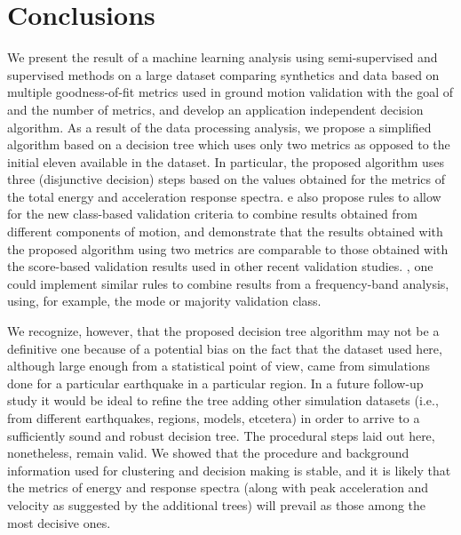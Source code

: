 
\section{Conclusions}

We present the result of a machine learning analysis using semi-supervised and supervised methods on a large dataset comparing synthetics and data based on multiple goodness-of-fit metrics used in ground motion validation with the goal of   and   the number of metrics, and develop an application independent decision algorithm. As a result of the data processing analysis, we propose a simplified algorithm based on a decision tree which uses only two metrics as opposed to the initial eleven available in the dataset. In particular, the proposed algorithm uses three (disjunctive decision) steps based on the values obtained for the metrics of the total energy and acceleration response spectra. e also propose rules to allow for the new class-based validation criteria to combine results obtained from different components of motion, and demonstrate that the results obtained with the proposed algorithm using two metrics are comparable to those obtained with the score-based validation results used in other recent validation studies.  , one could implement similar rules to combine results from a frequency-band analysis, using, for example, the mode or majority validation class. 

We recognize, however, that the proposed decision tree algorithm may not be a definitive one because of a potential bias on the fact that the dataset used here, although large enough from a statistical point of view, came from simulations done for a particular earthquake  in a particular region. In a future follow-up study it would be ideal to refine the tree adding other simulation datasets (i.e., from different earthquakes, regions, models,  etcetera) in order to arrive to a sufficiently sound and robust decision tree. The procedural steps laid out here, nonetheless, remain valid. We showed that the procedure and background information used for clustering and decision making is stable, and it is likely that the metrics of energy and response spectra (along with peak acceleration and velocity as suggested by the additional trees) will prevail as those among the most decisive ones.


